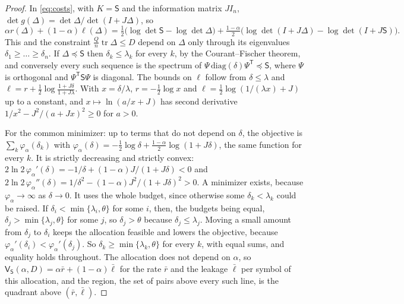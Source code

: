 \documentclass[11pt,onecolumn]{IEEEtran}
\newcommand{\tr}{\operatorname{tr}}
\begin{document}
\begin{proof}
In \eqref{eq:costs}, with $K=\mathsf S$ and the information matrix
$JI_n$, $\det g(\Delta)=\det\Delta/\det(I+J\Delta)$, so
\[
\alpha r(\Delta)+(1-\alpha)\ell(\Delta)=\tfrac12\bigl(\log\det\mathsf S-\log\det\Delta\bigr)+\tfrac{1-\alpha}2\bigl(\log\det(I+J\Delta)-\log\det(I+J\mathsf S)\bigr).
\]
This and the constraint $\tfrac Qn\tr\Delta\le D$ depend on $\Delta$ only
through its eigenvalues $\delta_1\ge\dots\ge\delta_n$. If
$\Delta\preceq\mathsf S$ then $\delta_k\le\lambda_k$ for every $k$, by the
Courant--Fischer theorem, and conversely every such sequence is the
spectrum of $\Psi\,\mathrm{diag}(\delta)\Psi^{\mathsf T}\preceq\mathsf S$,
where $\Psi$ is orthogonal and $\Psi^{\mathsf T}\mathsf S\Psi$ is
diagonal. The bounds on $\ell$ follow from $\delta\le\lambda$ and
$\ell=r+\tfrac12\log\frac{1+J\delta}{1+J\lambda}$. With $x=\delta/\lambda$,
$r=-\tfrac12\log x$ and $\ell=\tfrac12\log(1/(\lambda x)+J)$ up to a
constant, and $x\mapsto\ln(a/x+J)$ has second derivative
$1/x^2-J^2/(a+Jx)^2\ge0$ for $a>0$.

For the common minimizer: up to terms that do not depend on $\delta$, the
objective is $\sum_k\varphi_\alpha(\delta_k)$ with
$\varphi_\alpha(\delta)=-\tfrac12\log\delta+\tfrac{1-\alpha}2\log(1+J\delta)$,
the same function for every $k$. It is strictly decreasing and strictly
convex: $2\ln2\,\varphi_\alpha'(\delta)=-1/\delta+(1-\alpha)J/(1+J\delta)<0$
and $2\ln2\,\varphi_\alpha''(\delta)=1/\delta^2-(1-\alpha)J^2/(1+J\delta)^2>0$.
A minimizer exists, because $\varphi_\alpha\to\infty$ as $\delta\to0$. It
uses the whole budget, since otherwise some $\delta_k<\lambda_k$ could be
raised. If $\delta_i<\min\{\lambda_i,\theta\}$ for some $i$, then, the
budgets being equal, $\delta_j>\min\{\lambda_j,\theta\}$ for some $j$, so
$\delta_j>\theta$ because $\delta_j\le\lambda_j$. Moving a small amount
from $\delta_j$ to $\delta_i$ keeps the allocation feasible and lowers the
objective, because $\varphi_\alpha'(\delta_i)<\varphi_\alpha'(\delta_j)$.
So $\delta_k\ge\min\{\lambda_k,\theta\}$ for every $k$, with equal sums,
and equality holds throughout. The allocation does not depend on
$\alpha$, so $\mathsf V_{\mathsf S}(\alpha,D)=\alpha\bar r+(1-\alpha)\bar\ell$
for the rate $\bar r$ and the leakage $\bar\ell$ per symbol of this
allocation, and the region, the set of pairs above every such line, is
the quadrant above $(\bar r,\bar\ell)$.
\end{proof}
\end{document}
